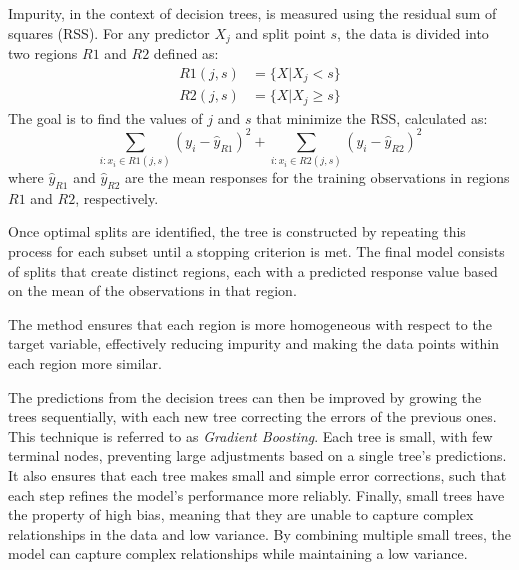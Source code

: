 Impurity, in the context of decision trees, is measured using the residual sum of squares (RSS). For any predictor $X_j$ and split point $s$, the data is divided into two regions $R1$ and $R2$ defined as:
$$
\begin{aligned}
    R1(j, s) &= \{X | X_j < s\} \\
    R2(j, s) &= \{X | X_j \geq s\}
\end{aligned}
$$
The goal is to find the values of $j$ and $s$ that minimize the RSS, calculated as:
$$
    \sum_{i: x_i \in R1(j, s)} (y_i - \hat{y}_{R1})^2 + \sum_{i: x_i \in R2(j, s)} (y_i - \hat{y}_{R2})^2
$$
where $\hat{y}_{R1}$ and $\hat{y}_{R2}$ are the mean responses for the training observations in regions $R1$ and $R2$, respectively.

Once optimal splits are identified, the tree is constructed by repeating this process for each subset until a stopping criterion is met. 
The final model consists of splits that create distinct regions, each with a predicted response value based on the mean of the observations in that region.

The method ensures that each region is more homogeneous with respect to the target variable, effectively reducing impurity and making the data points within each region more similar.

The predictions from the decision trees can then be improved by growing the trees sequentially, with each new tree correcting the errors of the previous ones. 
This technique is referred to as \textit{Gradient Boosting}. 
Each tree is small, with few terminal nodes, preventing large adjustments based on a single tree's predictions. 
It also ensures that each tree makes small and simple error corrections, such that each step refines the model's performance more reliably.
Finally, small trees have the property of high bias, meaning that they are unable to capture complex relationships in the data and low variance.
By combining multiple small trees, the model can capture complex relationships while maintaining a low variance.

